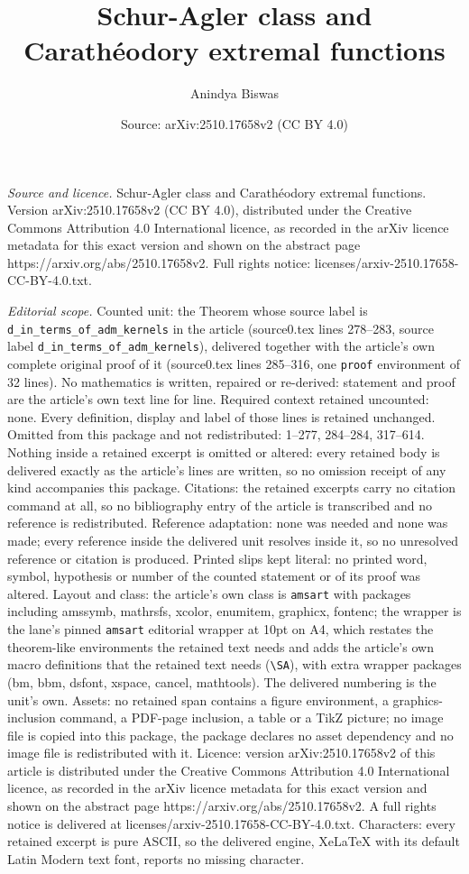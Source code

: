 \documentclass[10pt,a4paper]{amsart}
\title[Schur-Agler class and Carath\'eodory extremal functions]{Schur-Agler class and Carath\'eodory extremal functions}
\author{Anindya Biswas}
\date{Source: arXiv:2510.17658v2 (CC BY 4.0)}
\begin{document}
\maketitle

\noindent\emph{Source and licence.} Schur-Agler class and Carath\'eodory extremal functions. Version arXiv:2510.17658v2 (CC BY 4.0), distributed under the Creative Commons Attribution 4.0 International licence, as recorded in the arXiv licence metadata for this exact version and shown on the abstract page https://arxiv.org/abs/2510.17658v2. Full rights notice: licenses/arxiv-2510.17658-CC-BY-4.0.txt.\par\smallskip

\noindent\textit{Editorial scope.} Counted unit: the Theorem whose source label is \texttt{d\_in\_terms\_of\_adm\_kernels} in the article (source0.tex lines 278--283, source label \texttt{d\_in\_terms\_of\_adm\_kernels}), delivered together with the article's own complete original proof of it (source0.tex lines 285--316, one \texttt{proof} environment of 32 lines). No mathematics is written, repaired or re-derived: statement and proof are the article's own text line for line. Required context retained uncounted: none. Every definition, display and label of those lines is retained unchanged. Omitted from this package and not redistributed: 1--277, 284--284, 317--614. Nothing inside a retained excerpt is omitted or altered: every retained body is delivered exactly as the article's lines are written, so no omission receipt of any kind accompanies this package. Citations: the retained excerpts carry no citation command at all, so no bibliography entry of the article is transcribed and no reference is redistributed. Reference adaptation: none was needed and none was made; every reference inside the delivered unit resolves inside it, so no unresolved reference or citation is produced. Printed slips kept literal: no printed word, symbol, hypothesis or number of the counted statement or of its proof was altered. Layout and class: the article's own class is \texttt{amsart} with packages including amssymb, mathrsfs, xcolor, enumitem, graphicx, fontenc; the wrapper is the lane's pinned \texttt{amsart} editorial wrapper at 10pt on A4, which restates the theorem-like environments the retained text needs and adds the article's own macro definitions that the retained text needs (\texttt{\textbackslash SA}), with extra wrapper packages (bm, bbm, dsfont, xspace, cancel, mathtools). The delivered numbering is the unit's own. Assets: no retained span contains a figure environment, a graphics-inclusion command, a PDF-page inclusion, a table or a TikZ picture; no image file is copied into this package, the package declares no asset dependency and no image file is redistributed with it. Licence: version arXiv:2510.17658v2 of this article is distributed under the Creative Commons Attribution 4.0 International licence, as recorded in the arXiv licence metadata for this exact version and shown on the abstract page https://arxiv.org/abs/2510.17658v2. A full rights notice is delivered at licenses/arxiv-2510.17658-CC-BY-4.0.txt. Characters: every retained excerpt is pure ASCII, so the delivered engine, XeLaTeX with its default Latin Modern text font, reports no missing character.
\end{document}

